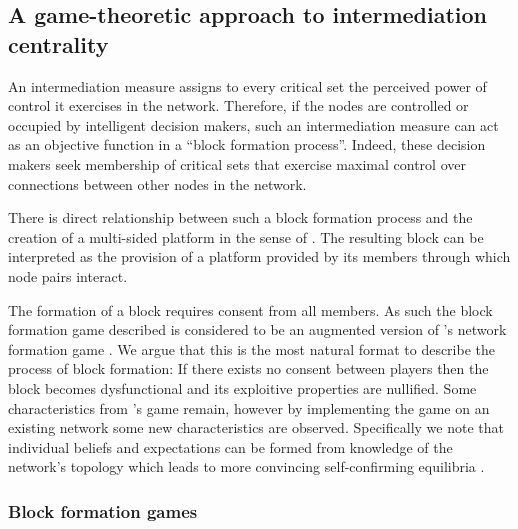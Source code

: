 \subsection{A game-theoretic approach to intermediation centrality}

An intermediation measure assigns to every critical set the perceived power of control it exercises in the network. Therefore, if the nodes are controlled or occupied by intelligent decision makers, such an intermediation measure can act as an objective function in a ``block formation process''. Indeed, these decision makers seek membership of critical sets that exercise maximal control over connections between other nodes in the network.

There is direct relationship between such a block formation process and the creation of a multi-sided platform in the sense of \citet{HagiuWright2015}. The resulting block can be interpreted as the provision of a platform provided by its members through which node pairs interact.

The formation of a block requires consent from all members. As such the block formation game described is considered to be an augmented version of \citeauthor{Myerson1991}'s network formation game \cite[see][page 448]{Myerson1991}. We argue that this is the most natural format to describe the process of block formation: If there exists no consent between players then the block becomes dysfunctional and its exploitive properties are nullified. Some characteristics from \citeauthor{Myerson1991}'s game remain, however by implementing the game on an existing network some new characteristics are observed. Specifically we note that individual beliefs and expectations can be formed from knowledge of the network's topology which leads to more convincing self-confirming equilibria \citep{GillesSarangi2010}.

\subsubsection*{Block formation games}

